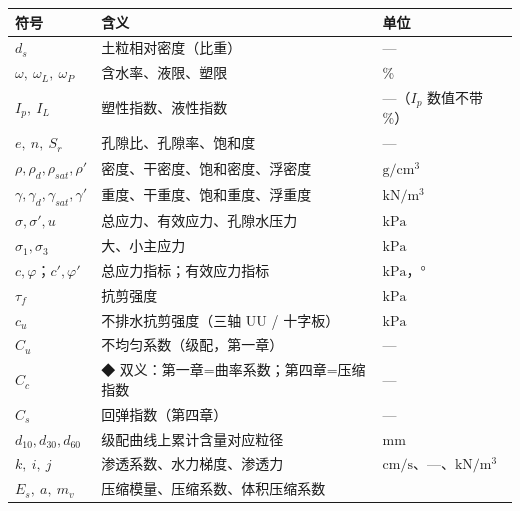 \documentclass[
]{article}
\newcounter{none} %
\begin{document}
{\def\LTcaptype{none} %
\begin{longtable}[]{@{}
  >{\raggedright\arraybackslash}p{}
  >{\raggedright\arraybackslash}p{}
  >{\raggedright\arraybackslash}p{}@{}}
\toprule\noalign{}
\begin{minipage}[b]{\linewidth}\raggedright
符号
\end{minipage} & \begin{minipage}[b]{\linewidth}\raggedright
含义
\end{minipage} & \begin{minipage}[b]{\linewidth}\raggedright
单位
\end{minipage} \\
\midrule\noalign{}
\endhead
\bottomrule\noalign{}
\endlastfoot
\(d_s\) & 土粒相对密度（比重） & --- \\
\(\omega,\ \omega_L,\ \omega_P\) & 含水率、液限、塑限 & \% \\
\(I_p,\ I_L\) & 塑性指数、液性指数 & ---（\(I_p\) 数值不带 \%） \\
\(e,\ n,\ S_r\) & 孔隙比、孔隙率、饱和度 & --- \\
\(\rho,\rho_d,\rho_{sat},\rho'\) & 密度、干密度、饱和密度、浮密度 &
\(\mathrm{g/cm^3}\) \\
\(\gamma,\gamma_d,\gamma_{sat},\gamma'\) &
重度、干重度、饱和重度、浮重度 & \(\mathrm{kN/m^3}\) \\
\(\sigma,\sigma',u\) & 总应力、有效应力、孔隙水压力 &
\(\mathrm{kPa}\) \\
\(\sigma_1,\sigma_3\) & 大、小主应力 & \(\mathrm{kPa}\) \\
\(c,\varphi\)；\(c',\varphi'\) & 总应力指标；有效应力指标 &
\(\mathrm{kPa}\)，° \\
\(\tau_f\) & 抗剪强度 & \(\mathrm{kPa}\) \\
\(c_u\) & 不排水抗剪强度（三轴 UU / 十字板） & \(\mathrm{kPa}\) \\
\(C_u\) & 不均匀系数（级配，第一章） & --- \\
\(C_c\) & ◆ 双义：第一章=曲率系数；第四章=压缩指数 & --- \\
\(C_s\) & 回弹指数（第四章） & --- \\
\(d_{10},d_{30},d_{60}\) & 级配曲线上累计含量对应粒径 & mm \\
\(k,\ i,\ j\) & 渗透系数、水力梯度、渗透力 &
\(\mathrm{cm/s}\)、---、\(\mathrm{kN/m^3}\) \\
\(E_s,\ a,\ m_v\) & 压缩模量、压缩系数、体积压缩系数 &

\end{longtable}}
\end{document}
